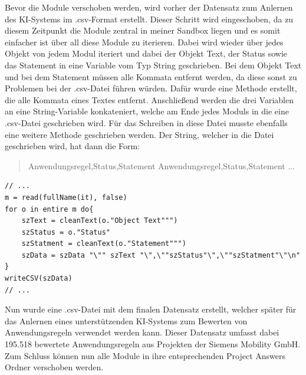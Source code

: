 Bevor die Module verschoben werden, wird vorher der Datensatz zum Anlernen des KI-Systems im .csv-Format erstellt. Dieser
Schritt wird eingeschoben, da zu diesem Zeitpunkt die Module zentral in meiner Sandbox liegen und es somit einfacher ist über all diese Module zu iterieren. Dabei wird wieder über jedes Objekt
von jedem Modul iteriert und dabei der Objekt Text, der Status sowie das Statement in eine Variable vom Typ String geschrieben. Bei dem Objekt Text und bei dem Statement müssen alle Kommata entfernt
werden, da diese sonst zu Problemen bei der .csv-Datei führen würden. Dafür wurde eine Methode erstellt, die alle Kommata eines Textes entfernt. Anschließend werden die drei Variablen an eine
String-Variable konkateniert, welche am Ende jedes Moduls in die eine .csv-Datei geschrieben wird. Für das Schreiben in diese Datei musste ebenfalls eine weitere Methode geschrieben werden. 
Der String, welcher in die Datei geschrieben wird, hat dann die Form:

\begin{quotation}
    \noindent
    \dq Anwendungsregel\dq,\dq Status\dq,\dq Statement\dq \linebreak
    \dq Anwendungsregel\dq,\dq Status\dq,\dq Statement\dq \linebreak
    ...
\end{quotation}

\begin{lstlisting}[caption={Daten in eine .csv-Datei schreiben}, captionpos=b, label = lst:writeCSV]
// ...
m = read(fullName(it), false)
for o in entire m do{
    szText = cleanText(o."Object Text""")
    szStatus = o."Status"
    szStatment = cleanText(o."Statement""")
    szData = szData "\"" szText "\",\""szStatus"\",\""szStatment"\"\n"
}
writeCSV(szData)
// ...
\end{lstlisting}

Nun wurde eine .csv-Datei mit dem finalen Datensatz erstellt, welcher später für das Anlernen eines unterstützenden KI-Systems zum Bewerten von Anwendungsregeln verwendet werden kann.
Dieser Datensatz umfasst dabei 195.518 bewertete Anwendungsregeln aus Projekten der Siemens Mobility GmbH. Zum Schluss können nun alle Module in ihre entsprechenden Project Answers Ordner 
verschoben werden. 
